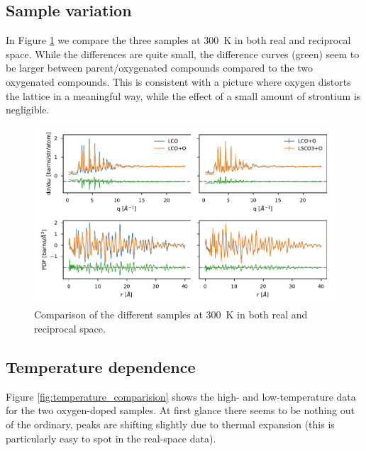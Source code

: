 \subsection{Sample variation}
In Figure \ref{fig:sample_comparision} we compare the three samples at \SI{300}{\kelvin} in both real and reciprocal space. While the differences are quite small, the difference curves (green) seem to be larger between parent/oxygenated compounds compared to the two oxygenated compounds. This is consistent with a picture where oxygen distorts the lattice in a meaningful way, while the effect of a small amount of strontium is negligible.

\begin{figure}
    \centering
    \includegraphics[width=\textwidth]{fig/pdf/sample_comparison.pdf}
    \caption{Comparison of the different samples at \SI{300}{\kelvin} in both real and reciprocal space.}
    \label{fig:sample_comparision}    
\end{figure}

\subsection{Temperature dependence}
Figure \ref{fig:temperature_comparision} shows the high- and low-temperature data for the two oxygen-doped samples. At first glance there seems to be nothing out of the ordinary, peaks are shifting slightly due to thermal expansion (this is particularly easy to spot in the real-space data).


